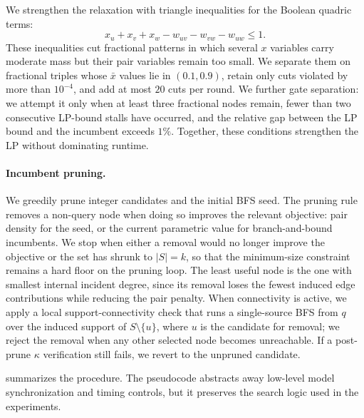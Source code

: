 \documentclass[12pt]{article}
\begin{document}
We strengthen the relaxation with triangle inequalities for the Boolean quadric terms:
\begin{equation}
  \label{eq:triangle-cut}
  x_u+x_v+x_w-w_{uv}-w_{vw}-w_{uw}\le 1.
\end{equation}
These inequalities cut fractional patterns in which several $x$ variables carry moderate mass but their pair variables remain too small.  We separate them on fractional triples whose $\bar{x}$ values lie in $(0.1,0.9)$, retain only cuts violated by more than $10^{-4}$, and add at most $20$ cuts per round.  We further gate separation: we attempt it only when at least three fractional nodes remain, fewer than two consecutive LP-bound stalls have occurred, and the relative gap between the LP bound and the incumbent exceeds $1\%$.  Together, these conditions strengthen the LP without dominating runtime.

\paragraph{Incumbent pruning.}
We greedily prune integer candidates and the initial BFS seed.  The pruning rule removes a non-query node when doing so improves the relevant objective: pair density for the seed, or the current parametric value for branch-and-bound incumbents.  We stop when either a removal would no longer improve the objective or the set has shrunk to $|S|=k$, so that the minimum-size constraint remains a hard floor on the pruning loop.  The least useful node is the one with smallest internal incident degree, since its removal loses the fewest induced edge contributions while reducing the pair penalty.  When connectivity is active, we apply a local support-connectivity check that runs a single-source BFS from $q$ over the induced support of $S\setminus\{u\}$, where $u$ is the candidate for removal; we reject the removal when any other selected node becomes unreachable.  If a post-prune $\kappa$ verification still fails, we revert to the unpruned candidate.

 summarizes the procedure.  The pseudocode abstracts away low-level model synchronization and timing controls, but it preserves the search logic used in the experiments.
\end{document}
